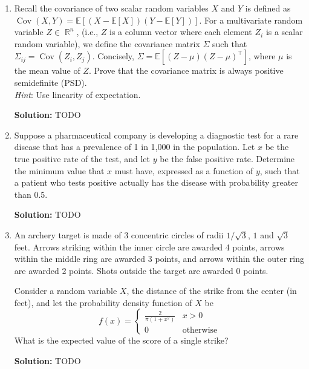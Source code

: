 \documentclass{article}
\DeclareMathOperator{\cov}{\mathrm{Cov}}
\DeclareMathOperator{\R}{\mathbb{R}}
\newenvironment{solution}{\color{blue} \smallskip \textbf{Solution:}}{}
\begin{document}
\begin{enumerate} 
    
    \item 
    Recall the covariance of two scalar random variables $X$ and $Y$ is defined as $\cov(X,Y)=\mathbb{E}[(X-\mathbb{E}[X])(Y-\mathbb{E}[Y])]$. 
    For a multivariate random variable $Z \in \R^n$, (i.e., $Z$ is a column vector where each element $Z_i$ is a scalar random variable), we define the covariance matrix $\Sigma$ such that $\Sigma_{ij}=\cov(Z_i, Z_j)$. 
    Concisely, $\Sigma=\mathbb{E}[(Z-\mu)(Z-\mu)^\top ]$, where $\mu$ is the mean value of $Z$. 
    Prove that the covariance matrix is always positive semidefinite (PSD). \\
    \emph{Hint}: Use linearity of expectation.

    \begin{solution}
        TODO
    \end{solution}

    \item
    Suppose a pharmaceutical company is developing a diagnostic test for a rare disease that has a prevalence of 1 in 1,000 in the population. 
    Let $x$ be the true positive rate of the test, and let $y$ be the false positive rate. 
    Determine the minimum value that $x$ must have, expressed as a function of $y$, such that a patient who tests positive actually has the disease with probability greater than 0.5.

    \begin{solution}
        TODO
    \end{solution}

    \item
    An archery target is made of 3 concentric circles of radii $1/{\sqrt{3}}$, $1$ and $\sqrt{3}$ feet. 
    Arrows striking within the inner circle are awarded 4 points, arrows within the middle ring are awarded 3 points, and arrows within the outer ring are awarded 2 points. 
    Shots outside the target are awarded 0 points.

    Consider a random variable $X$, the distance of the strike from the center (in feet), and let the probability density function of $X$ be
    \[
        f(x) = \begin{cases} \frac{2}{\pi (1+x^2)} & x>0 \\ 0 & \text{otherwise} \end{cases}
    \]
    What is the expected value of the score of a single strike?

    \begin{solution}
        TODO
    \end{solution}


\end{enumerate}
\end{document}
